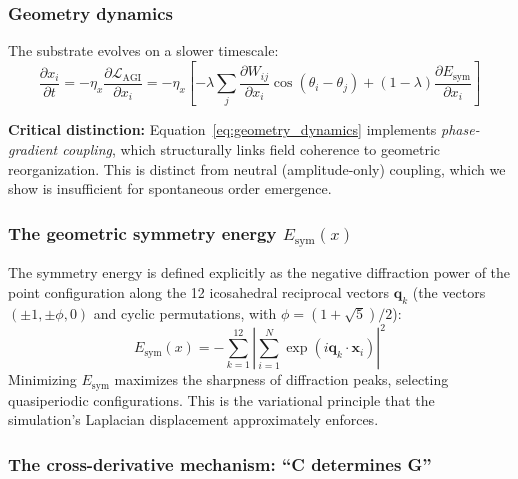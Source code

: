 \documentclass[12pt,a4paper]{article}
\theoremstyle{plain}
\theoremstyle{definition}
\begin{document}
\subsubsection{Geometry dynamics}

The substrate evolves on a slower timescale:
\begin{equation}
\label{eq:geometry_dynamics}
\frac{\partial x_i}{\partial t}
  = -\eta_x \frac{\partial \mathcal{L}_{\text{AGI}}}{\partial x_i}
  = -\eta_x \left[
      -\lambda \sum_j \frac{\partial W_{ij}}{\partial x_i}
        \cos(\theta_i - \theta_j)
      + (1-\lambda) \frac{\partial E_{\text{sym}}}{\partial x_i}
    \right]
\end{equation}

\textbf{Critical distinction:} Equation~\eqref{eq:geometry_dynamics}
implements \emph{phase-gradient coupling}, which structurally links field
coherence to geometric reorganization. This is distinct from neutral
(amplitude-only) coupling, which we show is insufficient for spontaneous
order emergence.

\subsubsection{The geometric symmetry energy $E_{\text{sym}}(x)$}

The symmetry energy is defined explicitly as the negative diffraction power
of the point configuration along the 12 icosahedral reciprocal vectors
$\mathbf{q}_k$ (the vectors $(\pm 1, \pm \phi, 0)$ and cyclic permutations,
with $\phi = (1+\sqrt{5})/2$):
\begin{equation}
\label{eq:esym}
E_{\text{sym}}(x) = -\sum_{k=1}^{12} \left|
  \sum_{i=1}^{N} \exp(i \mathbf{q}_k \cdot \mathbf{x}_i)
\right|^2
\end{equation}
Minimizing $E_{\text{sym}}$ maximizes the sharpness of diffraction peaks,
selecting quasiperiodic configurations. This is the variational principle
that the simulation's Laplacian displacement approximately enforces.

\subsubsection{The cross-derivative mechanism: ``C determines G''}
\end{document}

